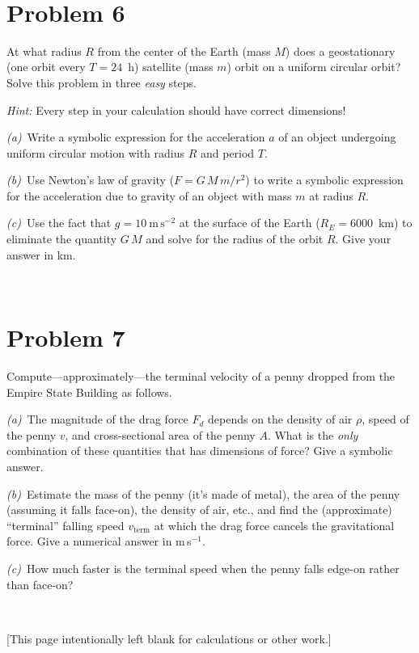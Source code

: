 \documentclass[12pt]{article}
\begin{document}
\vfill ~

\clearpage

\section*{Problem 6}

At what radius $R$ from the center of the Earth (mass $M$) does a
geostationary (one orbit every $T=24$~h) satellite (mass $m$) orbit on
a uniform circular orbit?  Solve this problem in three \emph{easy}
steps.

\emph{Hint:} Every step in your calculation should have correct
dimensions!

\textsl{(a)}~Write a symbolic expression for the acceleration $a$ of
   an object undergoing uniform circular motion with radius $R$ and
   period $T$.

\vfill

\textsl{(b)}~Use Newton's law of gravity ($F=G\,M\,m/r^2$) to write a
   symbolic expression for the acceleration due to gravity of an
   object with mass $m$ at radius $R$.

\vfill

\textsl{(c)}~Use the fact that $g=10~\mathrm{m\,s^{-2}}$ at the
   surface of the Earth ($R_E=6000$~km) to eliminate the quantity
   $G\,M$ and solve for the radius of the orbit $R$.  Give your answer
   in km.

\vfill ~

\clearpage

\section*{Problem 7}

Compute---approximately---the terminal velocity of a penny dropped
from the Empire State Building as follows.

\textsl{(a)}~The magnitude of the drag force $F_d$ depends on the
density of air $\rho$, speed of the penny $v$, and cross-sectional
area of the penny $A$.  What is the \emph{only} combination of these
quantities that has dimensions of force?  Give a symbolic answer.

\vfill

\textsl{(b)}~Estimate the mass of the penny (it's made of metal), the
area of the penny (assuming it falls face-on), the density of air,
etc., and find the (approximate) ``terminal'' falling speed
$v_\mathrm{term}$ at which the drag force cancels the gravitational
force.  Give a numerical answer in m\,s$^{-1}$.

\vfill

\textsl{(c)}~How much faster is the terminal speed when the penny
falls edge-on rather than face-on?

\vfill ~

\clearpage


\clearpage

[This page intentionally left blank for calculations or other work.]
\end{document}
